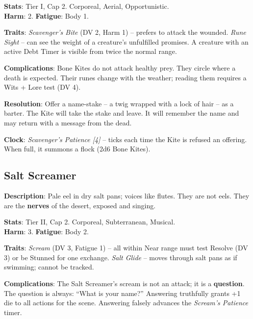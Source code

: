 \noindent\textbf{Stats}: Tier I, Cap 2. Corporeal, Aerial, Opportunistic.\\
\textbf{Harm}: 2. \textbf{Fatigue}: Body 1.

\noindent\textbf{Traits}: 
\emph{Scavenger's Bite} (DV 2, Harm 1) -- prefers to attack the wounded. \emph{Rune Sight} -- can see the weight of a creature's unfulfilled promises. A creature with an active Debt Timer is visible from twice the normal range.

\noindent\textbf{Complications}: Bone Kites do not attack healthy prey. They circle where a death is expected. Their runes change with the weather; reading them requires a Wits + Lore test (DV 4).

\noindent\textbf{Resolution}: Offer a name-stake -- a twig wrapped with a lock of hair -- as a barter. The Kite will take the stake and leave. It will remember the name and may return with a message from the dead.

\noindent\textbf{Clock}: \emph{Scavenger's Patience [4]} -- ticks each time the Kite is refused an offering. When full, it summons a flock (2d6 Bone Kites).


\subsection*{Salt Screamer}

\noindent\textbf{Description}: Pale eel in dry salt pans; voices like flutes. They are not eels. They are the \textbf{nerves} of the desert, exposed and singing.

\noindent\textbf{Stats}: Tier II, Cap 2. Corporeal, Subterranean, Musical.\\
\textbf{Harm}: 3. \textbf{Fatigue}: Body 2.

\noindent\textbf{Traits}: 
\emph{Scream} (DV 3, Fatigue 1) -- all within Near range must test Resolve (DV 3) or be Stunned for one exchange. \emph{Salt Glide} -- moves through salt pans as if swimming; cannot be tracked.

\noindent\textbf{Complications}: The Salt Screamer's scream is not an attack; it is a \textbf{question}. The question is always: ``What is your name?'' Answering truthfully grants +1 die to all actions for the scene. Answering falsely advances the \emph{Scream's Patience} timer.

